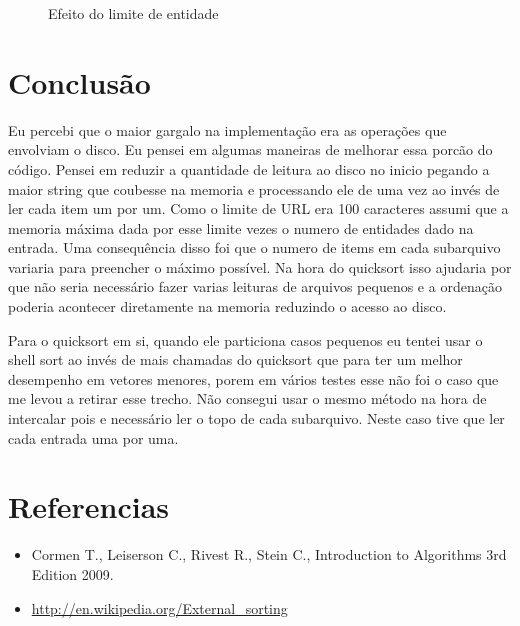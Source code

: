 \documentclass[a4paper, 11pt]{article}
\begin{document}
\begin{figure}[!htb]
\begin{center}

\end{center}
\caption{Efeito do limite de entidade}
\end{figure}

\section{Conclusão}
Eu percebi que o maior gargalo na implementação era as operações que envolviam o disco. Eu pensei em algumas maneiras de melhorar essa porcão do código. Pensei em reduzir a quantidade de leitura ao disco no inicio pegando a maior string que coubesse na memoria e processando ele de uma vez ao invés de ler cada item um por um. Como o limite de URL era 100 caracteres assumi que a memoria máxima dada por esse limite vezes o numero de entidades dado na entrada. Uma consequência disso foi que o numero de items em cada subarquivo variaria para preencher o máximo possível. Na hora do quicksort isso ajudaria por que não seria necessário    fazer varias leituras de arquivos pequenos e a ordenação poderia acontecer diretamente na memoria reduzindo o acesso ao disco. 

Para o quicksort em si, quando ele particiona casos pequenos eu tentei usar o shell sort ao invés de mais chamadas do quicksort que para ter um melhor desempenho em vetores menores, porem em vários testes esse não foi o caso que me levou a retirar esse trecho. Não consegui usar o mesmo método na hora de intercalar pois e necessário ler o topo de cada subarquivo. Neste caso tive que ler cada entrada uma por uma.
\section{Referencias}
\begin{itemize} 
\item Cormen T., Leiserson C., Rivest R., Stein C., Introduction to Algorithms 3rd Edition 2009.
\item \url{http://en.wikipedia.org/External\_sorting}
\end{itemize}
\end{document}
